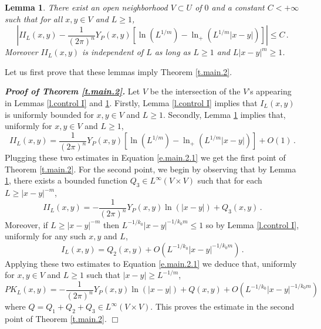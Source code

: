 \documentclass[10pt,twoside]{article}
\newenvironment{prf}[1][]
{\vskip 2mm  {\it \bf Proof#1. }}{$\Box$ \vskip 2mm}
\numberwithin{theorem}{section}
\newtheorem{lemma}[theorem]{Lemma}
\begin{document}
\begin{lemma}\label{l.control II}
  There exist an open neighborhood $V\subset U$ of $0$ and a constant $C<+\infty$ such that for all $x,y\in V$ and $L\geq 1$,
\[
\left|II_L(x,y)-\frac{1}{(2\pi)^n}Y_P(x,y)\left[\ln\left(L^{1/m}\right)-\ln_+\left(L^{1/m}|x-y|\right)\right]\right|\leq C\, .
\]
Moreover $II_L(x,y)$ is independent of $L$ as long as $L\geq 1$ and $L|x-y|^m\geq 1$.
\end{lemma}

Let us first prove that these lemmas imply Theorem \ref{t.main.2}.

\begin{prf}[ of Theorem \ref{t.main.2}]
Let $V$ be the intersection of the $V$'s appearing in Lemmas \ref{l.control I} and \ref{l.control II}. Firstly, Lemma \ref{l.control I} implies that $I_L(x,y)$ is uniformly bounded for $x,y\in V$ and $L\geq 1$. Secondly, Lemma \ref{l.control II} implies that, uniformly for $x,y\in V$ and $L\geq 1$,
\[
II_L(x,y)=\frac{1}{(2\pi)^n}Y_P(x,y)\left[\ln\left(L^{1/m}\right)-\ln_+\left(L^{1/m}|x-y|\right)\right]+O(1)\, .
\]
Plugging these two estimates in Equation \eqref{e.main.2.1} we get the first point of Theorem \ref{t.main.2}. For the second point, we begin by observing that by Lemma \ref{l.control II}, there exists a bounded function $Q_3\in L^\infty(V\times V)$ such that for each $L\geq |x-y|^{-m}$,
\[
II_L(x,y)=-\frac{1}{(2\pi)^n}Y_P(x,y)\ln\left(|x-y|\right)+Q_3(x,y)\, .
\]
Moreover, if $L\geq |x-y|^{-m}$ then $L^{-1/k_0}|x-y|^{-1/k_0m}\leq 1$ so by Lemma \ref{l.control I}, uniformly for any such $x,y$ and $L$,
\[
I_L(x,y)=Q_2(x,y)+O\left(L^{-1/k_0}|x-y|^{-1/k_0m}\right)\, .
\]
Applying these two estimates to Equation \eqref{e.main.2.1} we deduce that, uniformly for $x,y\in V$ and $L\geq 1$ such that $|x-y|\geq L^{-1/m}$,
\[
PK_L(x,y)=-\frac{1}{(2\pi)^n}Y_P(x,y)\ln\left(|x-y|\right)+Q(x,y)+O\left(L^{-1/k_0}|x-y|^{-1/k_0m}\right)
\]
where $Q=Q_1+Q_2+Q_3\in L^\infty(V\times V)$. This proves the estimate in the second point of Theorem \ref{t.main.2}.
\end{prf}
\end{document}
